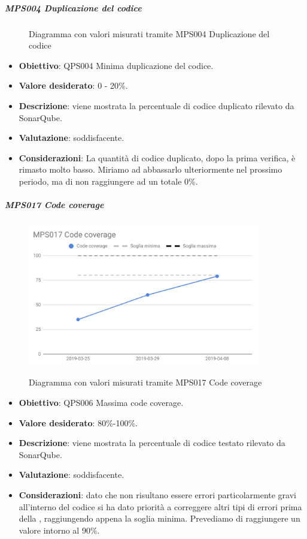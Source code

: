	\subparagraph{MPS004 Duplicazione del codice}
	
	\begin{figure}[H]
		\centering
		\label{immaginePresenzaDupplicazioneCodiceRP}
		\caption{Diagramma con valori misurati tramite MPS004 Duplicazione del codice}
	\end{figure}
	
	\begin{itemize}
		\item \textbf{Obiettivo}: QPS004 Minima duplicazione del codice.
		\item \textbf{Valore desiderato}: 0 - 20\%.
		\item \textbf{Descrizione}: viene mostrata la percentuale di codice duplicato rilevato da SonarQube.
		\item \textbf{Valutazione}: soddisfacente.
		\item \textbf{Considerazioni}: La quantità di codice duplicato, dopo la prima verifica, è rimasto molto basso. Miriamo ad abbassarlo ulteriormente nel prossimo periodo, ma di non raggiungere ad un totale 0\%.
	\end{itemize}

	\subparagraph{MPS017 Code coverage}
	
	\begin{figure}[H]
		\centering
		\includegraphics[width=0.9\textwidth]{img/cruscotti/RQ/MPS017.png}
		\label{immaginePresenzaCodeSmellRP}
		\caption{Diagramma con valori misurati tramite MPS017 Code coverage}
	\end{figure}
	
	\begin{itemize}
		\item \textbf{Obiettivo}: QPS006 Massima code coverage.
		\item \textbf{Valore desiderato}: 80\%-100\%.
		\item \textbf{Descrizione}: viene mostrata la percentuale di codice testato rilevato da SonarQube.
		\item \textbf{Valutazione}: soddisfacente.
		\item \textbf{Considerazioni}: dato che non risultano essere errori particolarmente gravi all'interno del codice si ha dato priorità a correggere altri tipi di errori prima della \RQ, raggiungendo appena la soglia minima.
		Prevediamo di raggiungere un valore intorno al 90\%.
	\end{itemize}

